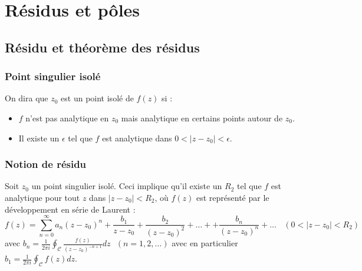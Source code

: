 \chapter{Résidus et p\^oles}

\section{Résidu et théorème des résidus}

	\subsection{Point singulier isolé}
	On dira que $z_0$ est un point isolé de $f(z)$ si :
	\begin{itemize}
	\item $f$ n'est pas analytique en $z_0$ mais analytique en certains points
	autour de $z_0$.
	\item Il existe un $\epsilon$ tel que $f$ est analytique dans $0<|z-z_0|<
	\epsilon$.
	\end{itemize}
	
	
	\subsection{Notion de résidu}
	Soit $z_0$ un point singulier isolé. Ceci implique qu'il existe un $R_2$ tel 
	que $f$ est analytique pour tout $z$ dans $|z-z_0| < R_2$, où $f(z)$ est 
	représenté par le développement en série de Laurent :
	\begin{equation}
	f(z) = \sum_{n=0}^\infty a_n(z-z_0)^n + \frac{b_1}{z-z_0}+\frac{b_2}{(z-z_0)^2}
	+ \dots + + \frac{b_n}{(z-z_0)^n} + \dots\ \ \ \ (0<|z-z_0|<R_2)
	\end{equation}
	avec $b_n = \frac{1}{2\pi i}\oint_\mathcal{C}\frac{f(z)}{(z-z_0)^{-n+1}}dz\ \
	\ (n=1,2,\dots)$ avec en particulier $b_1 = \frac{1}{2\pi i}\oint_\mathcal{C}
	f(z) dz$.\\
	
	\ \\
	
